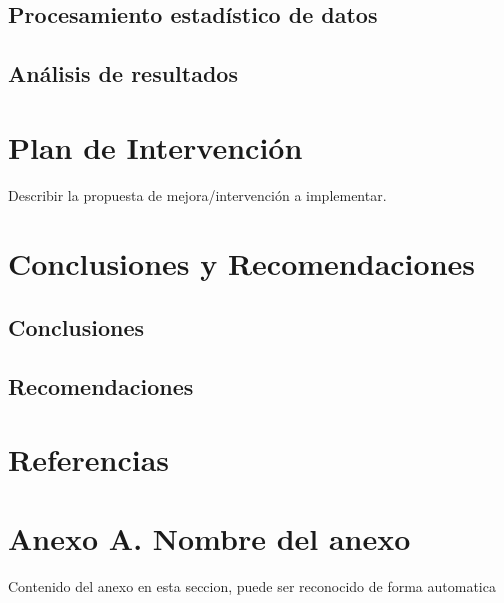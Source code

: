 \documentclass[12pt]{article}
\newcommand{\chapterbreak}{\clearpage \thispagestyle{fancy}}
\begin{document}
\subsection*{Procesamiento estad\'istico de datos}
\subsection*{An\'alisis de resultados}

\chapterbreak

\section{Plan de Intervenci\'on}
Describir la propuesta de mejora/intervenci\'on a implementar.

\chapterbreak

\section{Conclusiones y Recomendaciones}
\subsection*{Conclusiones}
\subsection*{Recomendaciones}

\chapterbreak

\section*{Referencias}
\printbibliography[heading=bibintoc]

\chapterbreak

\appendix
\section*{Anexo A. Nombre del anexo}
Contenido del anexo en esta seccion, puede ser reconocido de forma automatica
\end{document}
